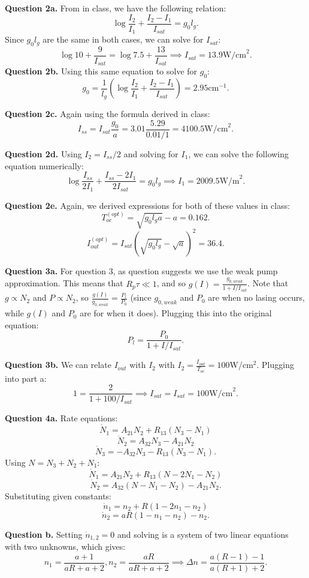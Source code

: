 \documentclass[letterpaper, reqno,11pt]{article}
\begin{document}
{\medskip\noindent\bf Question 2a.} From in class, we have the following relation:
\[
\log \frac{I_2}{I_1}+\frac{I_2-I_1}{I_{sat}}=g_0l_g
.\]
Since $g_0l_g$ are the same in both cases, we can solve for $I_{sat}$:
\[
\log 10+ \frac{9}{I_{sat}}=\log 7.5+\frac{13}{I_{sat}}\implies I_{sat}=13.9\text{W/cm}^2
.\]
{\medskip\noindent\bf Question 2b.} Using this same equation to solve for $g_0$:
\[
g_0= \frac{1}{l_g}\left( \log \frac{I_2}{I_1}+\frac{I_2-I_1}{I_{sat}} \right)=2.95\text{cm}^{-1}
.\]

{\medskip\noindent\bf Question 2c.} Again using the formula derived in class:
\[
I_{ss}=I_{sat} \frac{g_0}{a}=3.01 \frac{5.29}{0.01 /1}=4100.5\text{W/cm}^2
.\]

{\medskip\noindent\bf Question 2d.} Using $I_{2}=I_{ss}/2$ and solving for $I_1$, we can solve the following equation numerically:
\[
\log \frac{I_{ss}}{2I_1}+ \frac{I_{ss}-2I_1}{2I_{sat}}=g_0l_g\implies I_1=2009.5\text{W/m}^2
.\]

{\medskip\noindent\bf Question 2e.} Again, we derived expressions for both of these values in class:
\[
T^{(opt)}_{oc}=\sqrt{g_0l_ga}-a=0.162
.\]
\[
I^{(opt)}_{out}=I_{sat}\left( \sqrt{g_0l_g}-\sqrt{a} \right) ^2=36.4
.\]

{\medskip\noindent\bf Question 3a.} For question 3, as question suggests we use the weak pump approximation. This means that $R_{p}\tau\ll 1$, and so $g(I)= \frac{g_{0,weak}}{1+I/I_{sat}}$. Note that $g\propto N_2$ and $P\propto N_2$, so $\frac{g(I)}{g_{0,weak}}=\frac{P_l}{P_0}$ (since $g_{0,weak}$ and $P_0$ are when no lasing occurs, while $g(I)$ and $P_0$ are for when it does). Plugging this into the original equation:
\[
P_l=\frac{P_0}{1+I /I_{sat}}
.\]

{\medskip\noindent\bf Question 3b.} We can relate $I_{out}$ with $I_{2}$ with $I_2=\frac{I_{out}}{T_{oc}}=100$W/cm$^{2}$. Plugging into part a:
\[
1=\frac{2}{1+100 /I_{sat}}\implies I_{sat}=I_{sat}=100\text{W/cm}^2
.\]

{\medskip\noindent\bf Question 4a.} Rate equations:
\[
\dot N_1=A_{21}N_2+R_{13}\left( N_3-N_1 \right) 
\]
\[
\dot N_2=A_{32}N_3-A_{21}N_2 
\]
\[
\dot N_3=-A_{32}N_3-R_{13}\left( N_3-N_1 \right) 
.\]
Using $N=N_3+N_2+N_1$:
\[
\dot N_1=A_{21}N_2+R_{13}\left( N-2N_1-N_2 \right) 
\]
\[
\dot N_2=A_{32}(N-N_1-N_2)-A_{21}N_2 
.\]
Substituting given constants:
\[
\dot n_1=n_2+R\left( 1-2n_1-n_2 \right) 
\]
\[
\dot n_2=aR\left( 1-n_1-n_2 \right) -n_2
.\]

{\medskip\noindent\bf Question b.} Setting $\dot n_{1,2}=0$ and solving is a system of two linear equations with two unknowns, which gives:
\[
    n_1= \frac{a+1}{aR+a+2}, n_2= \frac{aR}{aR+a+2}\implies \Delta n=\frac{a(R-1)-1}{a(R+1)+2}
.\]
\end{document}
